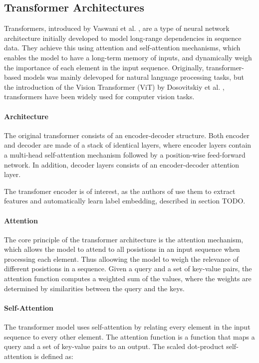 \documentclass[lettersize,journal]{IEEEtran}
\begin{document}
\subsection{Transformer Architectures}
Transformers, introduced by Vaswani et al. \cite{vaswani2023attentionneed}, are a type of neural network architecture initially developed to model long-range dependencies in sequence data. They achieve this using attention and self-attention mechanisms, which enables the model to have a long-term memory of inputs, and dynamically weigh the importance of each element in the input sequence. Originally, transformer-based models was mainly delevoped for natural language processing tasks, but the introduction of the Vision Transformer (ViT) by Dosovitskiy et al. \cite{dosovitskiy2021imageworth16x16words}, transformers have been widely used for computer vision tasks. 

\paragraph{Architecture}
The original transformer consists of an encoder-decoder structure. Both encoder and decoder are made of a stack of identical layers, where encoder layers contain a multi-head self-attention mechanism followed by a position-wise feed-forward network. In addition, decoder layers consists of an encoder-decoder attention layer. 

The transfomer encoder is of interest, as the authors of \cite{Query2Label} use them to extract features and automatically learn label embedding, described in section TODO.

\paragraph{Attention}
The core principle of the transformer architecture is the attention mechanism, which allows the model to attend to all posistions in an input sequence when processing each element. Thus alloowing the model to weigh the relevance of different posistions in a sequence. Given a query and a set of key-value pairs, the attention function computes a weighted sum of the values, where the weights are determined by similarities between the query and the keys.

\paragraph{Self-Attention}
The transformer model uses self-attention by relating every element in the input sequence to every other element. The attention function is a function that maps a query and a set of key-value pairs to an output. The scaled dot-product self-attention is defined as:
\end{document}
